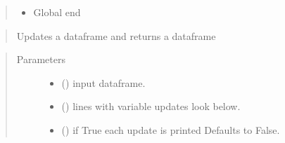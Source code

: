 \documentclass[letterpaper,10pt,english]{sphinxmanual}
\begin{document}
\begin{fulllineitems}
\begin{fulllineitems}
\begin{quote}
\begin{description}
\begin{itemize}
\item {} 
\sphinxAtStartPar
{} \textendash{} Global end

\end{itemize}

\end{description}\end{quote}

\end{fulllineitems}


\begin{fulllineitems}
\label{\detokenize{core/modelclass:modelclass.Model_help_Mixin.update}}
\pysigstartsignatures
{}
\pysigstopsignatures\begin{quote}

\sphinxAtStartPar
Updates a dataframe and returns a dataframe
\end{quote}
\begin{quote}\begin{description}
\item[{Parameters}] \leavevmode\begin{itemize}
\item {} 
\sphinxAtStartPar
{} () \textendash{} input dataframe.

\item {} 
\sphinxAtStartPar
{} () \textendash{} lines with variable updates look below.

\item {} 
\sphinxAtStartPar
{} (\sphinxstyleliteralemphasis{\sphinxupquote{, }}) \textendash{} if True each update is printed  Defaults to False.


\end{itemize}
\end{description}
\end{quote}
\end{fulllineitems}
\end{fulllineitems}
\end{document}
